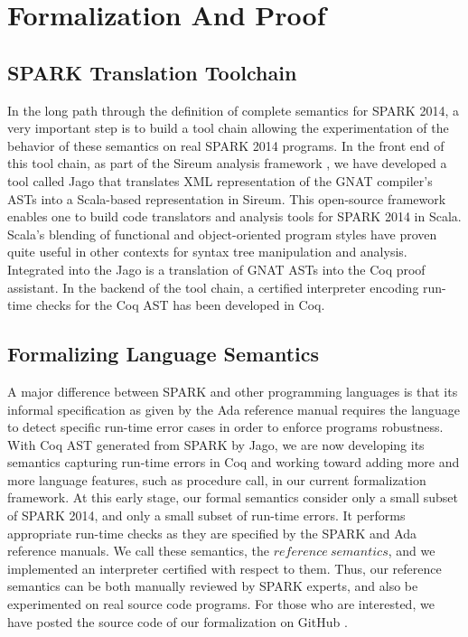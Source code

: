 \section{Formalization And Proof}

\subsection{SPARK Translation Toolchain}
In the long path through the definition of complete semantics for
SPARK 2014, a very important step is to build a tool chain allowing 
the experimentation of the behavior of these semantics on real SPARK
2014 programs. In the front end of this tool chain, as part of the 
Sireum analysis framework \cite{Sireum:URL}, we have developed a tool called Jago
\cite{Jago:URL} that translates XML representation of the GNAT compiler's 
ASTs into a Scala-based 
representation in Sireum.  This open-source framework enables one to build
code translators and analysis tools for SPARK 2014 in Scala.  Scala's 
blending of functional %
and object-oriented program styles have proven 
quite useful in other contexts for syntax tree manipulation and analysis.  
Integrated into the Jago is a translation of GNAT ASTs into the Coq proof 
assistant. In the backend of the tool chain, a certified interpreter 
encoding run-time checks for the Coq AST has been developed in Coq.

\subsection{Formalizing Language Semantics}
A major difference between SPARK and other programming languages is that 
its %
informal specification as given by the Ada reference manual requires the
language to detect specific run-time error cases in order to enforce
programs robustness.
 With Coq AST generated from SPARK by Jago, we 
are now developing its semantics capturing run-time errors in Coq and working toward 
adding more and more language features, such as procedure call, in our current 
formalization framework.
At this early stage, our formal semantics consider only a small subset
of SPARK 2014, and only a small subset of run-time errors.  It performs 
appropriate run-time checks as they are specified by the SPARK and Ada 
reference manuals.  We call these semantics, the $\mathit{reference\
semantics}$, and we implemented an interpreter certified with respect to them.
Thus, our reference semantics can be both manually reviewed by SPARK 
experts, and also be experimented on real source code programs.
For those who are interested, we have posted the source code of our
formalization on GitHub \cite{Formalization:URL}.


